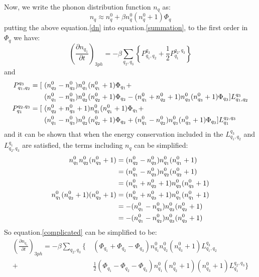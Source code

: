 \documentclass{article}
\newcommand{\pfrac}[2]{\frac{\partial #1}{\partial #2}}
\begin{document}
Now, we write the phonon distribution function $n_q$ as:
\begin{equation}
    n_q \approx n_q^0 + \beta n_q^0(n_q^0+1)\Phi_q  \label{dn}
\end{equation}
putting the above equation.\ref{dn} into equation.\ref{summation}, to the first order in $\Phi_q$ we have:
\begin{equation}
    \left( \pfrac{n_{q_1}}{t} \right)_{3ph} = - \beta \sum_{q_2,q_3} \left\{ P_{q_1,q_2}^{q_3} + \frac{1}{2} P^{q_2,q_3}_{q_1} \right\} 
\end{equation}
and
\begin{align}
    P_{q_1,q_2}^{q_3} = [\ &(n_{q_2}^0 - n_{q_3}^0) n_{q_1}^0 (n_{q_1}^0+1) \Phi_{q_1} + \notag \\ 
                          & (n_{q_1}^0 - n_{q_3}^0) n_{q_2}^0 (n_{q_2}^0+1)    \Phi_{q_2} 
                            - (n_{q_1}^0 + n_{q_2}^0 + 1) n_{q_3}^0 (n_{q_3}^0+1) \Phi_{q_3} ] L_{q_1,q_2}^{q_3} \\
    P^{q_2,q_3}_{q_1} = [\ &(n_{q_2}^0 + n_{q_3}^0 + 1) n_{q_1}^0 (n_{q_1}^0+1) \Phi_{q_1} + \notag \\ 
                         & (n_{q_1}^0 - n_{q_3}^0) n_{q_2}^0 (n_{q_2}^0+1) \Phi_{q_2} 
                            + (n_{q_1}^0 - n_{q_2}^0) n_{q_3}^0 (n_{q_3}^0+1) \Phi_{q_3} ] L^{q_2,q_3}_{q_1} \label{complicated}
\end{align}
and it can be shown that when the energy conservation included in the $L_{q_1,q_2}^{q_3}$ and $L_{q_2,q_3}^{q_1}$ are satisfied, the 
terms including $n_q$ can be simplified:
\begin{align}
    n_{q_1}^0 n_{q_2}^0 (n_{q_3}^0 + 1) &= (n_{q_2}^0 - n_{q_3}^0) n_{q_1}^0 (n_{q_1}^0+1) \notag \\
                                  &= (n_{q_1}^0 - n_{q_3}^0) n_{q_2}^0 (n_{q_2}^0+1) \notag \\
                                  &= (n_{q_1}^0 + n_{q_2}^0 + 1) n_{q_3}^0 (n_{q_3}^0+1) \\
    n_{q_1}^0 (n_{q_2}^0+1) (n_{q_3}^0 + 1) &= (n_{q_2}^0 + n_{q_3}^0 + 1) n_{q_1}^0 (n_{q_1}^0+1) \notag \\
                                    &= - (n_{q_1}^0 - n_{q_3}^0) n_{q_2}^0 (n_{q_2}^0+1) \notag \\
                                    &= - (n_{q_1}^0 - n_{q_2}^0) n_{q_3}^0 (n_{q_3}^0+1)
\end{align}
So equation.\ref{complicated} can be simplified to be:
\begin{align}
    \left( \pfrac{n_{q_1}}{t} \right)_{3ph} = - \beta \sum_{q_2,q_3} 
    \{\ &\left( \Phi_{q_1} + \Phi_{q_2} - \Phi_{q_3} \right) n_{q_1}^0 n_{q_2}^0 (n_{q_3}^0 + 1) L_{q_1,q_2}^{q_3} \\
      + &\frac{1}{2}\left( \Phi_{q_1} - \Phi_{q_2} - \Phi_{q_3} \right) n_{q_1}^0 (n_{q_2}^0+1) (n_{q_3}^0 + 1) L^{q_2,q_3}_{q_1} \} \label{simple}
\end{align}
\end{document}
